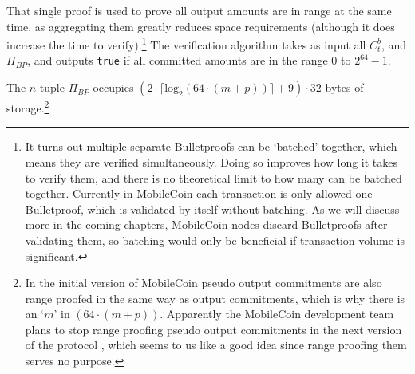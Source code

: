 That single proof is used to prove all output amounts are in range at the same time, as aggregating them greatly reduces space requirements (although it does increase the time to verify).\footnote{It turns out multiple separate Bulletproofs can be `batched' together, which means they are verified simultaneously. Doing so improves how long it takes to verify them, and there is no theoretical limit to how many can be batched together. Currently in MobileCoin each transaction is only allowed one Bulletproof, which is validated by itself without batching. As we will discuss more in the coming chapters, MobileCoin nodes discard Bulletproofs after validating them, so batching would only be beneficial if transaction volume is significant.} The verification algorithm takes as input all $C^b_t$, and $\Pi_{BP}$, and outputs {\tt true} if all committed amounts are in the range 0 to $2^{64} - 1$.

The $n$-tuple $\Pi_{BP}$ occupies $(2 \cdot \lceil \textrm{log}_2(64 \cdot (m + p)) \rceil + 9) \cdot 32$ bytes of storage.\footnote{In the initial version of MobileCoin pseudo output commitments are also range proofed in the same way as output commitments, which is why there is an `$m$' in $(64 \cdot (m + p))$. Apparently the MobileCoin development team plans to stop range proofing pseudo output commitments in the next version of the protocol \cite{mc-pull-request-revert-remove-pseudo-output-from-range-proof}, which seems to us like a good idea since range proofing them serves no purpose.}